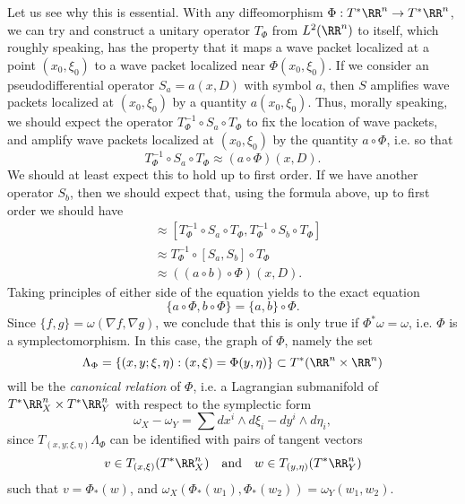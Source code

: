 Let us see why this is essential. With any diffeomorphism $\Phi: T^* \RR^n \to T^* \RR^n$, we can try and construct a unitary operator $T_\Phi$ from $L^2(\RR^n)$ to itself, which roughly speaking, has the property that it maps a wave packet localized at a point $(x_0,\xi_0)$ to a wave packet localized near $\Phi(x_0,\xi_0)$. If we consider an pseudodifferential operator $S_a = a(x,D)$ with symbol $a$, then $S$ amplifies wave packets localized at $(x_0,\xi_0)$ by a quantity $a(x_0,\xi_0)$. Thus, morally speaking, we should expect the operator $T_\Phi^{-1} \circ S_a \circ T_\Phi$ to fix the location of wave packets, and amplify wave packets localized at $(x_0,\xi_0)$ by the quantity $a \circ \Phi$, i.e. so that
%
\[ T_\Phi^{-1} \circ S_a \circ T_\Phi \approx (a \circ \Phi)(x,D). \]
%
We should at least expect this to hold up to first order. If we have another operator $S_b$, then we should expect that, using the formula above, up to first order we should have
%
\begin{align*}
    [(a \circ \Phi)(x,D), (b \circ \Phi)(x,D)] &\approx [T_\Phi^{-1} \circ S_a \circ T_\Phi, T_\Phi^{-1} \circ S_b \circ T_\Phi]\\
    &\approx T_\Phi^{-1} \circ [S_a,S_b] \circ T_\Phi\\
    &\approx ((a \circ b) \circ \Phi)(x,D).
\end{align*}
%
Taking principles of either side of the equation yields to the exact equation
%
\[ \{ a \circ \Phi, b \circ \Phi \} = \{ a, b \} \circ \Phi. \]
%
Since $\{ f,g \} = \omega( \nabla f, \nabla g )$, we conclude that this is only true if $\Phi^* \omega = \omega$, i.e. $\Phi$ is a symplectomorphism. In this case, the graph of $\Phi$, namely the set
%
\[ \Lambda_\Phi = \{ (x,y;\xi,\eta) : (x,\xi) = \Phi(y,\eta) \} \subset T^*(\RR^n \times \RR^n) \]
%
will be the \emph{canonical relation} of $\Phi$, i.e. a Lagrangian submanifold of $T^* \RR^n_X \times T^* \RR^n_Y$ with respect to the symplectic form
%
\[ \omega_X - \omega_Y = \sum dx^i \wedge d\xi_i - dy^i \wedge d\eta_i, \]
since $T_{(x,y;\xi,\eta)} \Lambda_\Phi$ can be identified with pairs of tangent vectors
%
\[ v \in T_{(x,\xi)} (T^* \RR^n_X) \quad\text{and}\quad w \in T_{(y,\eta)} (T^* \RR^n_Y) \]
%
such that $v = \Phi_*(w)$, and $\omega_X(\Phi_*(w_1),\Phi_*(w_2)) = \omega_Y(w_1,w_2)$.
%

